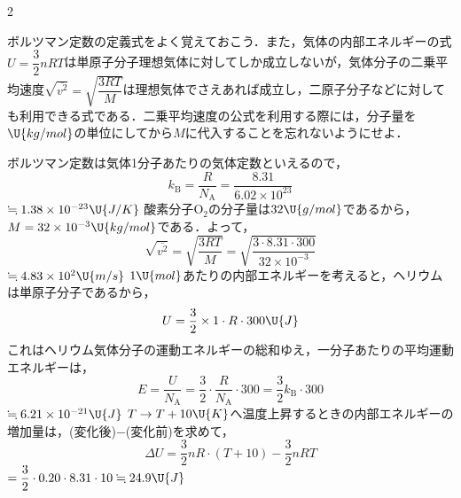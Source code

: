 \setlength{\columnseprule}{0.4pt}
\begin{multicols}{2}
\raggedcolumns

\par\nopagebreak
\begin{sisin}
ボルツマン定数の定義式をよく覚えておこう．また，気体の内部エネルギーの式$U=\dfrac{3}{2}nRT$は単原子分子理想気体に対してしか成立しないが，気体分子の二乗平均速度$\sqrt{\overline{v^2}}=\sqrt{\dfrac{3RT}{M}}$は理想気体でさえあれば成立し，二原子分子などに対しても利用できる式である．二乗平均速度の公式を利用する際には，分子量を$\U{kg/mol}$の単位にしてから$M$に代入することを忘れないようにせよ．
\end{sisin}
\KaiHead
\begin{komon}
 ボルツマン定数は気体1分子あたりの気体定数といえるので，
       \[k_{\mathrm{B}}=\frac{R}{N_{\mathrm{A}}}=\frac{8.31}{6.02\times 10^{23}}\]
       \hspace*{2zw}$\fallingdotseq 1.38\times 10^{-23}\U{J/K}$\Ans
{} 酸素分子$\mathrm{O_2}$の分子量は$32\U{g/mol}$であるから，$M=32\times 10^{-3}\U{kg/mol}$である．よって，
       \[\sqrt{\overline{v^2}}=\sqrt{\frac{3RT}{M}}=\sqrt{\frac{3\cdot 8.31\cdot 300}{32\times 10^{-3}}}\]
       \hspace*{2zw}$\fallingdotseq 4.83\times 10^2\U{m/s}$\Ans
{} $1\U{mol}$あたりの内部エネルギーを考えると，ヘリウムは単原子分子であるから，
       \[U=\frac{3}{2}\times 1\cdot R\cdot 300\U{J}\]
       これはヘリウム気体分子の運動エネルギーの総和ゆえ，一分子あたりの平均運動エネルギーは，
       \[E=\frac{U}{N_{\mathrm{A}}}=\frac{3}{2}\cdot\frac{R}{N_{\mathrm{A}}}\cdot 300=\frac{3}{2}k_{\mathrm{B}}\cdot 300\]
       \hspace*{2zw}$\fallingdotseq 6.21\times 10^{-21}\U{J}$\Ans
{} $T\to T+10\U{K}$へ温度上昇するときの内部エネルギーの増加量は，(変化後)$-$(変化前)を求めて，
       \[\Delta U=\frac{3}{2}nR\cdot(T+10)-\frac{3}{2}nRT\]
       \hspace*{2zw}$=\dfrac{3}{2}\cdot 0.20\cdot 8.31\cdot 10\fallingdotseq 24.9\U{J}$\Ans
\end{komon}


\end{multicols}
